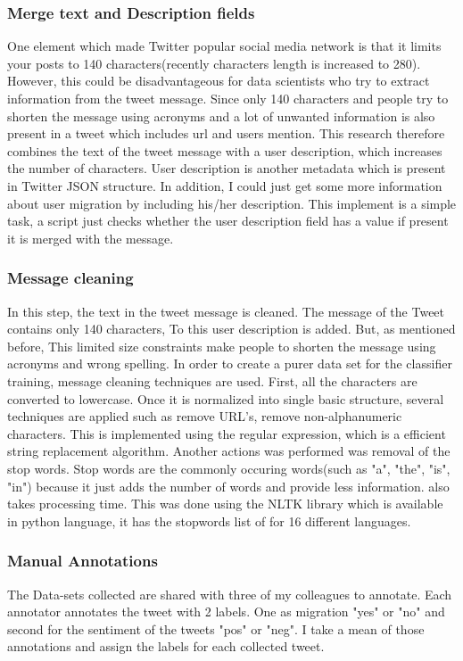 \subsubsection{Merge text and Description fields}

One element which made Twitter popular social media network is that it limits your posts to 140 characters(recently characters length is increased to 280). However, this could be disadvantageous for data scientists who try to extract information from the tweet message. Since only 140 characters and people try to shorten the message using acronyms and a lot of unwanted information is also present in a tweet which includes url and users mention. This research therefore combines the text of the tweet message with a user description, which increases the number of characters. User description is another metadata which is present in Twitter JSON structure. In addition, I could just get some more information about user migration by including his/her description. This implement is a simple task, a script just checks whether the user description field has a value if present it is merged with the message.

\subsubsection{Message cleaning}
In this step, the text in the tweet message is cleaned. The message of the Tweet contains only 140 characters, To this user description is added. But, as mentioned before, This limited size constraints make people to shorten the message using acronyms and wrong spelling. 
In order to create a purer data set for the classifier training, message cleaning techniques are used. First, all the characters are converted to lowercase. Once it is normalized into single basic structure, several techniques are applied such as remove URL's, remove non-alphanumeric characters. This is implemented using the regular expression, which is a efficient string replacement algorithm. Another actions was performed was removal of the stop words. Stop words are the commonly occuring words(such as "a", "the", "is", "in") because it just adds the number of words and provide less information. also takes processing time. This was done using the NLTK library which is available in python language, it has the stopwords list of for 16 different languages. 
\subsubsection{Manual Annotations}
The Data-sets collected are shared with three of my colleagues to annotate. Each annotator annotates the tweet with 2 labels. One as migration "yes" or "no" and second for the sentiment of the tweets "pos" or "neg". I take a mean of those annotations and assign the labels for each collected tweet.

